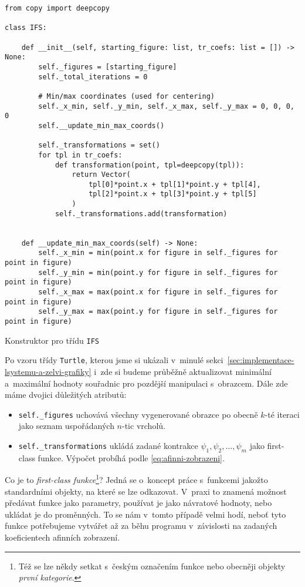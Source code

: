 \begin{program}[h]
\begin{lstlisting}[style=python]
from copy import deepcopy

class IFS:

    def __init__(self, starting_figure: list, tr_coefs: list = []) -> None:
        self._figures = [starting_figure]
        self._total_iterations = 0

        # Min/max coordinates (used for centering)
        self._x_min, self._y_min, self._x_max, self._y_max = 0, 0, 0, 0
        self.__update_min_max_coords()

        self._transformations = set()
        for tpl in tr_coefs:
            def transformation(point, tpl=deepcopy(tpl)):
                return Vector(
                    tpl[0]*point.x + tpl[1]*point.y + tpl[4],
                    tpl[2]*point.x + tpl[3]*point.y + tpl[5]
                )
            self._transformations.add(transformation)
    
    
    def __update_min_max_coords(self) -> None:
        self._x_min = min(point.x for figure in self._figures for point in figure)
        self._y_min = min(point.y for figure in self._figures for point in figure)
        self._x_max = max(point.x for figure in self._figures for point in figure)
        self._y_max = max(point.y for figure in self._figures for point in figure)
\end{lstlisting}
    \caption{Konstruktor pro třídu \texttt{IFS}}
    \label{prog:konstruktor-ifs}
\end{program}
Po vzoru třídy \texttt{Turtle}, kterou jsme si ukázali v~minulé sekci~\ref{sec:implementace-lsystemu-a-zelvi-grafiky} i~zde si budeme průběžně aktualizovat minimální a~maximální hodnoty souřadnic pro pozdější manipulaci s~obrazcem. Dále zde máme dvojici důležitých atributů:
\begin{itemize}
    \item \texttt{self.\_figures} uchovává všechny vygenerované obrazce po obecně $k$-té iteraci jako seznam uspořádaných $n$-tic vrcholů.
    \item \texttt{self.\_transformations} ukládá zadané kontrakce $\psi_1,\psi_2,\ldots,\psi_m$ jako first-class funkce. Výpočet probíhá podle \eqref{eq:afinni-zobrazeni}.
\end{itemize}
Co je to \emph{first-class funkce}\footnote{Též se lze někdy setkat s~českým označením funkce nebo obecněji objekty \emph{první kategorie}.}? Jedná se o~koncept práce s~funkcemi jakožto standardními objekty, na které se lze odkazovat. V~praxi to znamená možnost předávat funkce jako parametry, používat je jako návratové hodnoty, nebo ukládat je do proměnných. To se nám v~tomto případě velmi hodí, neboť tyto funkce potřebujeme vytvářet až za běhu programu v~závislosti na zadaných koeficientech afinních zobrazení.

